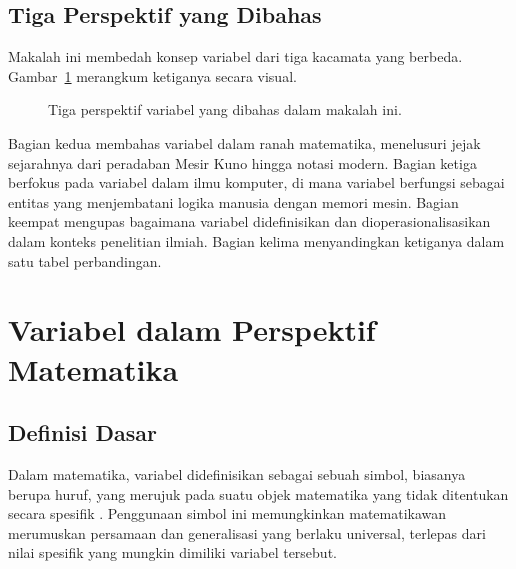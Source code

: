 \documentclass[11pt,a4paper]{article}
\begin{document}
\subsection{Tiga Perspektif yang Dibahas}

Makalah ini membedah konsep variabel dari tiga kacamata yang berbeda. Gambar~\ref{fig:overview} merangkum ketiganya secara visual.

\begin{figure}[H]
	\centering
	\caption{Tiga perspektif variabel yang dibahas dalam makalah ini.}
	\label{fig:overview}
\end{figure}

Bagian kedua membahas variabel dalam ranah matematika, menelusuri jejak sejarahnya dari peradaban Mesir Kuno hingga notasi modern. Bagian ketiga berfokus pada variabel dalam ilmu komputer, di mana variabel berfungsi sebagai entitas yang menjembatani logika manusia dengan memori mesin. Bagian keempat mengupas bagaimana variabel didefinisikan dan dioperasionalisasikan dalam konteks penelitian ilmiah. Bagian kelima menyandingkan ketiganya dalam satu tabel perbandingan.

\section{Variabel dalam Perspektif Matematika}

\subsection{Definisi Dasar}

Dalam matematika, variabel didefinisikan sebagai sebuah simbol, biasanya berupa huruf, yang merujuk pada suatu objek matematika yang tidak ditentukan secara spesifik \cite{sobolev}. Penggunaan simbol ini memungkinkan matematikawan merumuskan persamaan dan generalisasi yang berlaku universal, terlepas dari nilai spesifik yang mungkin dimiliki variabel tersebut.
\end{document}
